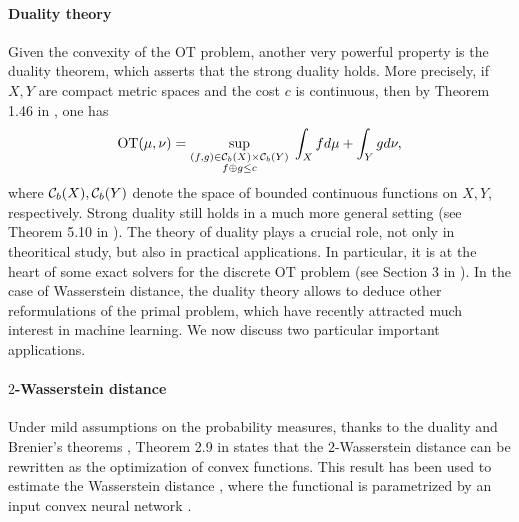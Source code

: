 \paragraph{Duality theory}
Given the convexity of the OT problem, another very powerful property
is the duality theorem, which asserts that the strong duality holds. More precisely,
if $X, Y$ are compact metric spaces and the cost $c$ is continuous, then by Theorem 1.46
in \citep{Fillipo15}, one has
\begin{align}
  \text{OT}(\mu, \nu) = \sup_{\substack{(f, g) \in \mathcal C_b(X) \times \mathcal C_b(Y) \\ f \oplus g \leq c}} \;
  \int_X f d\mu + \int_Y g d\nu,
\end{align}
where $\mathcal C_b(X), \mathcal C_b(Y)$ denote the space of bounded continuous functions on $X, Y$, respectively.
Strong duality still holds in a much more general setting (see Theorem 5.10 in \citep{Villani08}).
The theory of duality plays a crucial role, not only in theoritical study, but also
in practical applications. In particular, it is at the heart of some exact solvers
for the discrete OT problem (see Section 3 in \citep{Peyre19}).
In the case of Wasserstein distance, the duality theory allows to deduce other reformulations
of the primal problem, which have recently attracted much interest in machine learning.
We now discuss two particular important applications.

\paragraph{$2$-Wasserstein distance}
Under mild assumptions on the probability measures, thanks to the duality and
Brenier's theorems \citep{Brenier87}, Theorem 2.9 in \citep{Villani03} states that
the $2$-Wasserstein distance can be rewritten as the optimization of convex functions.
This result has been used to estimate the Wasserstein distance
\citep{Chartrand09,Taghvaei19,Korotin19,Makkuva20},
where the functional is parametrized by an input convex neural network \citep{Amos17}.

